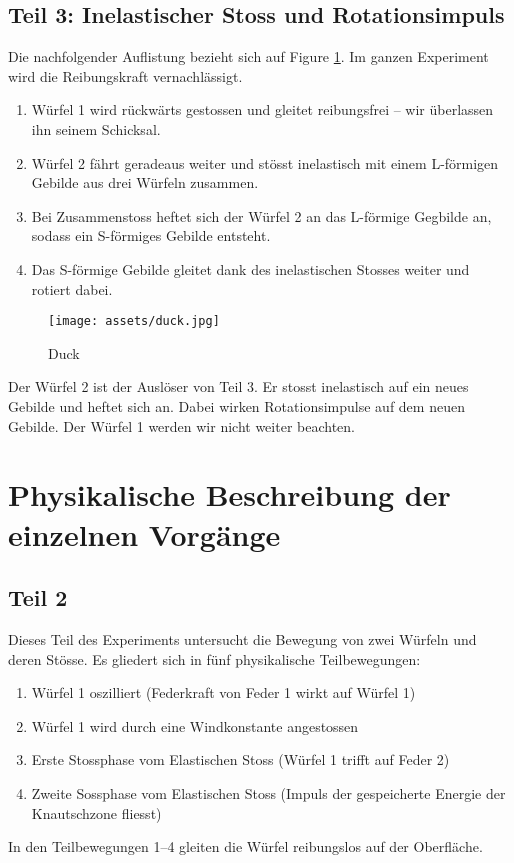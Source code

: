 \documentclass{article}
\begin{document}
\newpage
\subsection{Teil 3: Inelastischer Stoss und Rotationsimpuls}

Die nachfolgender Auflistung bezieht sich auf Figure \ref{fig:duck}. Im ganzen Experiment wird die Reibungskraft vernachlässigt.
\begin{enumerate}
    \item Würfel 1 wird rückwärts gestossen und gleitet reibungsfrei – wir überlassen ihn seinem Schicksal.
    \item Würfel 2 fährt geradeaus weiter und stösst inelastisch mit einem L-förmigen Gebilde aus drei Würfeln zusammen.
    \item Bei Zusammenstoss heftet sich der Würfel 2 an das L-förmige Gegbilde an, sodass ein S-förmiges Gebilde entsteht.
    \item Das S-förmige Gebilde gleitet dank des inelastischen Stosses weiter und rotiert dabei.
\end{enumerate}

\begin{figure}[H] 
\centering\texttt{[image: assets/duck.jpg]}
\scriptsize
\caption{Duck}
\label{fig:duck}
\end{figure}
\noindent
Der Würfel 2 ist der Auslöser von Teil 3. Er stosst inelastisch auf ein neues Gebilde und heftet sich an. Dabei wirken Rotationsimpulse auf dem neuen Gebilde. Der Würfel 1 werden wir nicht weiter beachten.

\newpage
\section{Physikalische Beschreibung der einzelnen Vorgänge}
\subsection{Teil 2}
Dieses Teil des Experiments untersucht die Bewegung von zwei Würfeln und deren Stösse. Es gliedert sich in fünf physikalische Teilbewegungen:

\begin{enumerate}
    \item Würfel 1 oszilliert (Federkraft von Feder 1 wirkt auf Würfel 1)
    \item Würfel 1 wird durch eine Windkonstante angestossen
    \item Erste Stossphase vom Elastischen Stoss (Würfel 1 trifft auf Feder 2)
    \item Zweite Sossphase vom Elastischen Stoss (Impuls der gespeicherte Energie der Knautschzone fliesst)

\end{enumerate}
     In den Teilbewegungen 1–4 gleiten die Würfel reibungslos auf der Oberfläche.
\end{document}
